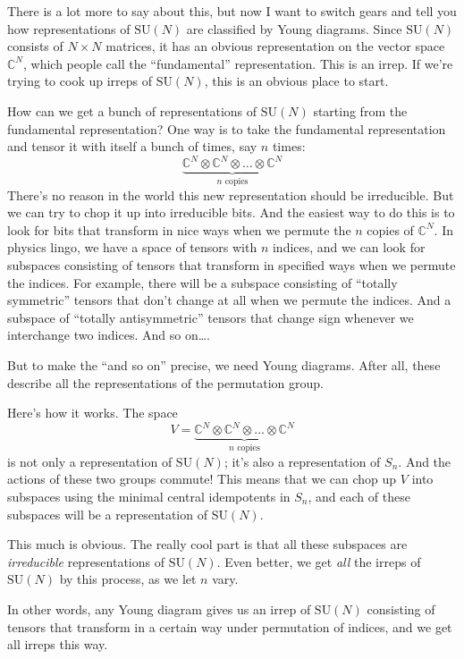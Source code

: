 \documentclass{article}
\begin{document}
There is a lot more to say about this, but now I want to switch gears
and tell you how representations of \(\mathrm{SU}(N)\) are classified by
Young diagrams. Since \(\mathrm{SU}(N)\) consists of \(N\times N\)
matrices, it has an obvious representation on the vector space
\(\mathbb{C}^N\), which people call the ``fundamental'' representation.
This is an irrep. If we're trying to cook up irreps of
\(\mathrm{SU}(N)\), this is an obvious place to start.

How can we get a bunch of representations of \(\mathrm{SU}(N)\) starting
from the fundamental representation? One way is to take the fundamental
representation and tensor it with itself a bunch of times, say \(n\)
times:
\[\underbrace{\mathbb{C}^N\otimes\mathbb{C}^N\otimes\ldots\otimes\mathbb{C}^N}_{\mbox{$n$ copies}}\]
There's no reason in the world this new representation should be
irreducible. But we can try to chop it up into irreducible bits. And the
easiest way to do this is to look for bits that transform in nice ways
when we permute the \(n\) copies of \(\mathbb{C}^N\). In physics lingo,
we have a space of tensors with \(n\) indices, and we can look for
subspaces consisting of tensors that transform in specified ways when we
permute the indices. For example, there will be a subspace consisting of
``totally symmetric'' tensors that don't change at all when we permute
the indices. And a subspace of ``totally antisymmetric'' tensors that
change sign whenever we interchange two indices. And so on\ldots.

But to make the ``and so on'' precise, we need Young diagrams. After
all, these describe all the representations of the permutation group.

Here's how it works. The space
\[V = \underbrace{\mathbb{C}^N\otimes\mathbb{C}^N\otimes\ldots\otimes\mathbb{C}^N}_{\mbox{$n$ copies}}\]
is not only a representation of \(\mathrm{SU}(N)\); it's also a
representation of \(S_n\). And the actions of these two groups commute!
This means that we can chop up \(V\) into subspaces using the minimal
central idempotents in \(S_n\), and each of these subspaces will be a
representation of \(\mathrm{SU}(N)\).

This much is obvious. The really cool part is that all these subspaces
are \emph{irreducible} representations of \(\mathrm{SU}(N)\). Even
better, we get \emph{all} the irreps of \(\mathrm{SU}(N)\) by this
process, as we let \(n\) vary.

In other words, any Young diagram gives us an irrep of
\(\mathrm{SU}(N)\) consisting of tensors that transform in a certain way
under permutation of indices, and we get all irreps this way.
\end{document}
